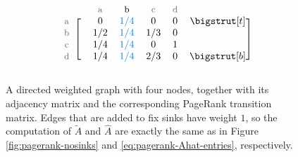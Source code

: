\begin{figure}[H]
\begin{subfigure}{.45\textwidth}
\begin{align*}
\begin{blockarray}{ccccccc}
& & \small\text{\textcolor{gray}{a}} & \small\text{b} & \small\text{\textcolor{gray}{c}} & \small\text{\textcolor{gray}{d}} & \\
\begin{block}{c[cccccc]}
\small\text{\textcolor{gray}{a}} & & 0 & \textcolor{blue}{1/4} & 0 & 0 & \topstrut\\
\small\text{\textcolor{gray}{b}} & & 1/2 & \textcolor{blue}{1/4} & 1/3 & 0 & \\
\small\text{\textcolor{gray}{c}} & & 1/4 & \textcolor{blue}{1/4} & 0 & 1 & \\
\small\text{\textcolor{gray}{d}} & & 1/4 & \textcolor{blue}{1/4} & 2/3 & 0 & \botstrut\\
\end{block}\end{blockarray}
\end{align*}
\end{subfigure}
\caption{A directed weighted graph with four nodes, together with its adjacency matrix and the corresponding PageRank transition matrix.
Edges that are added to fix sinks have weight $1$, so the computation of $\widetilde{A}$ and $\widehat{A}$ are exactly the same as in Figure \ref{fig:pagerank-nosinks} and \eqref{eq:pagerank-Ahat-entries}, respectively.
}
\label{fig:pagerank-weighted}
\end{figure}

